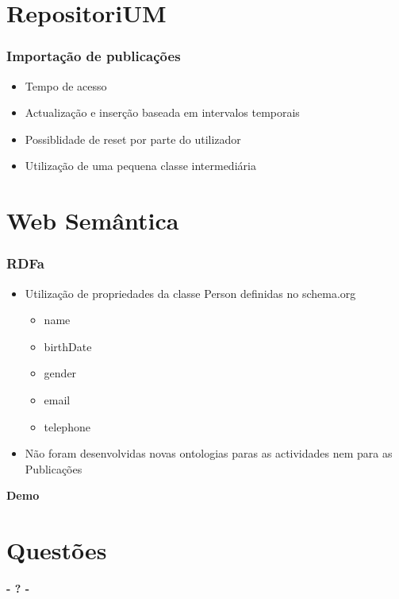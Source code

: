 \documentclass{beamer}
\begin{document}
\section{RepositoriUM}
\begin{frame}
	\frametitle{Importação de publicações}
	\begin{itemize}
		\item Tempo de acesso
		\item Actualização e inserção baseada em intervalos temporais
		\item Possiblidade de reset por parte do utilizador
		\item Utilização de uma pequena classe intermediária
		
	\end{itemize}
\end{frame}

\section{Web Semântica}
\begin{frame}
	\frametitle{RDFa}
	\begin{itemize}
		\item Utilização de propriedades da classe Person definidas no schema.org
		\begin{itemize}
			\item name
			\item birthDate
			\item gender
			\item email
			\item telephone
		\end{itemize}
		\item Não foram desenvolvidas novas ontologias paras as actividades nem para as Publicações
	\end{itemize}
\end{frame}


\begin{frame}
	\begin{center}
		\Huge\bfseries
		Demo
	\end{center}
\end{frame}

\section{Questões}
\begin{frame}
\titlepage
	\begin{center}
		\Huge\bfseries
		- ? -
	\end{center}
\end{frame}
\end{document}
